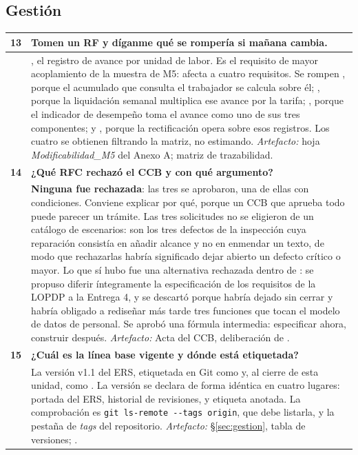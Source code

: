 \subsection*{Gestión}

\begin{longtable}{|C{0.7cm}|L{14.6cm}|}
\hline
{}\textbf{13} & \textbf{Tomen un RF y díganme qué se rompería si mañana cambia.}\\ \hline
& , el registro de avance por unidad de labor. Es el requisito de mayor acoplamiento de la muestra de M5: afecta a cuatro requisitos. Se rompen , porque el acumulado que consulta el trabajador se calcula sobre él; , porque la liquidación semanal multiplica ese avance por la tarifa; , porque el indicador de desempeño toma el avance como uno de sus tres componentes; y , porque la rectificación opera sobre esos registros. Los cuatro se obtienen filtrando la matriz, no estimando. \newline \emph{Artefacto:} hoja \emph{Modificabilidad\_M5} del Anexo A; matriz de trazabilidad.\\ \hline
{}\textbf{14} & \textbf{¿Qué RFC rechazó el CCB y con qué argumento?}\\ \hline
& \textbf{Ninguna fue rechazada}: las tres se aprobaron, una de ellas con condiciones. Conviene explicar por qué, porque un CCB que aprueba todo puede parecer un trámite. Las tres solicitudes no se eligieron de un catálogo de escenarios: son los tres defectos de la inspección cuya reparación consistía en añadir alcance y no en enmendar un texto, de modo que rechazarlas habría significado dejar abierto un defecto crítico o mayor. Lo que sí hubo fue una alternativa rechazada dentro de : se propuso diferir íntegramente la especificación de los requisitos de la LOPDP a la Entrega 4, y se descartó porque habría dejado  sin cerrar y habría obligado a rediseñar más tarde tres funciones que tocan el modelo de datos de personal. Se aprobó una fórmula intermedia: especificar ahora, construir después. \newline \emph{Artefacto:} Acta del CCB, deliberación de .\\ \hline
{}\textbf{15} & \textbf{¿Cuál es la línea base vigente y dónde está etiquetada?}\\ \hline
& La versión v1.1 del ERS, etiquetada en Git como  y, al cierre de esta unidad, como . La versión se declara de forma idéntica en cuatro lugares: portada del ERS, historial de revisiones,  y etiqueta anotada. La comprobación es \verb|git ls-remote --tags origin|, que debe listarla, y la pestaña de \emph{tags} del repositorio. \newline \emph{Artefacto:} \S\ref{sec:gestion}, tabla de versiones; .\\ \hline
\end{longtable}


